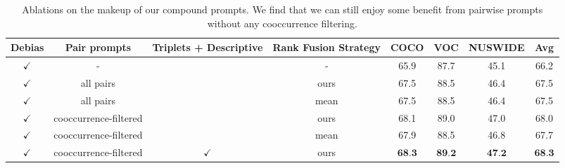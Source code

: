 \begin{table*}[ht]
\centering
\begin{tabular}{cccc|ccc|c}
\toprule
Debias & Pair prompts & Triplets + Descriptive & Rank Fusion Strategy & COCO & VOC & NUSWIDE & Avg  \\
\midrule
$\checkmark$ & - & & - & 65.9 & 87.7 & 45.1 & 66.2 \\
$\checkmark$ & all pairs & & ours & 67.5 & 88.5 & 46.4 & 67.5 \\
$\checkmark$ & all pairs & & mean & 67.5 & 88.5 & 46.4 & 67.5 \\
$\checkmark$ & cooccurrence-filtered & & ours & 68.1 & 89.0 & 47.0 & 68.0 \\
$\checkmark$ & cooccurrence-filtered & & mean & 67.9 & 88.5 & 46.8 & 67.7 \\
$\checkmark$ & cooccurrence-filtered & $\checkmark$ & ours & $\textbf{68.3}$ & $\textbf{89.2}$ & $\textbf{47.2}$ & $\textbf{68.3}$ \\
\bottomrule
\end{tabular}
\caption{Ablations on the makeup of our compound prompts. We find that we can still enjoy some benefit from pairwise prompts without any cooccurrence filtering.}
\end{table*}
